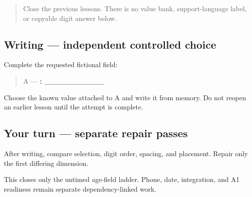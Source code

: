 \label{lesson:PA-W07-age-no-model}



\begin{quote}
Close the previous lessons. There is no value bank, support-language label, or copyable digit answer below.
\end{quote}

\subsection*{Writing — independent controlled choice}
Complete the requested fictional field:

\begin{quote}
A — \textbf{: \_\_\_\_\_\_\_\_\_\_}
\end{quote}

Choose the known value attached to A and write it from memory. Do not reopen an earlier lesson until the attempt is complete.

\subsection*{Your turn — separate repair passes}
After writing, compare selection, digit order, spacing, and placement. Repair only the first differing dimension.

\begin{tcolorbox}[breakable,colback=teal!4,colframe=teal!35!black,title={Before you move on}]
This closes only the untimed age-field ladder. Phone, date, integration, and A1 readiness remain separate dependency-linked work.
\end{tcolorbox}
